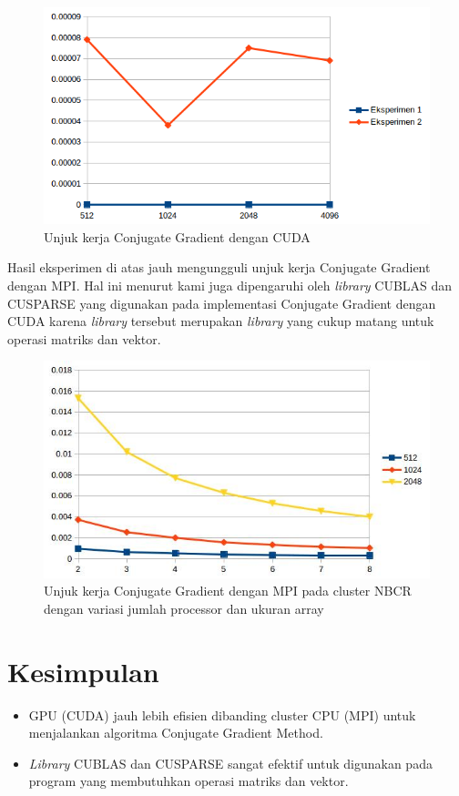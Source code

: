 \begin{figure}
	\centering
	\includegraphics[width=1\textwidth]
	{pics/cg_graph}
	\caption{Unjuk kerja Conjugate Gradient dengan CUDA}
	\label{fig:cggraph}
\end{figure}

Hasil eksperimen di atas jauh mengungguli unjuk kerja Conjugate Gradient dengan MPI.  Hal ini menurut kami juga dipengaruhi oleh \textit{library} CUBLAS dan CUSPARSE yang digunakan pada implementasi Conjugate Gradient dengan CUDA karena \textit{library} tersebut merupakan \textit{library} yang cukup matang untuk operasi matriks dan vektor.

\begin{figure}
	\centering
	\includegraphics[width=1\textwidth]
	{pics/cg_nbcr}
	\caption{Unjuk kerja Conjugate Gradient dengan MPI pada cluster NBCR dengan variasi jumlah processor dan ukuran array}
	\label{fig:cgmpi}
\end{figure}

\section{Kesimpulan}

\begin{itemize}
	\item GPU (CUDA) jauh lebih efisien dibanding cluster CPU (MPI) untuk menjalankan algoritma Conjugate Gradient Method.
	\item \textit{Library} CUBLAS dan CUSPARSE sangat efektif untuk digunakan pada program yang membutuhkan operasi matriks dan vektor.
\end{itemize}